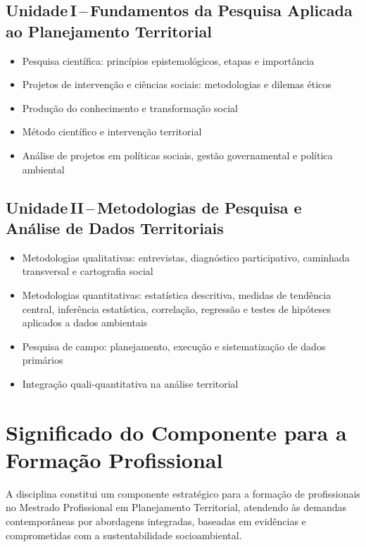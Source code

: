 \documentclass[11pt,a4paper]{article}
\begin{document}
\subsection*{Unidade\,I\,--\,Fundamentos da Pesquisa Aplicada ao Planejamento Territorial}
\begin{itemize}
\item Pesquisa científica: princípios epistemológicos, etapas e importância
\item Projetos de intervenção e ciências sociais: metodologias e dilemas éticos
\item Produção do conhecimento e transformação social
\item Método científico e intervenção territorial
\item Análise de projetos em políticas sociais, gestão governamental e política ambiental
\end{itemize}

\subsection*{Unidade\,II\,--\,Metodologias de Pesquisa e Análise de Dados Territoriais}
\begin{itemize}
\item Metodologias qualitativas: entrevistas, diagnóstico participativo, caminhada transversal e cartografia social
\item Metodologias quantitativas: estatística descritiva, medidas de tendência central, inferência estatística, correlação, regressão e testes de hipóteses aplicados a dados ambientais
\item Pesquisa de campo: planejamento, execução e sistematização de dados primários
\item Integração quali-quantitativa na análise territorial
\end{itemize}

\section*{Significado do Componente para a Formação Profissional}

A disciplina constitui um componente estratégico para a formação de profissionais no Mestrado Profissional em Planejamento Territorial, atendendo às demandas contemporâneas por abordagens integradas, baseadas em evidências e comprometidas com a sustentabilidade socioambiental.
\end{document}
